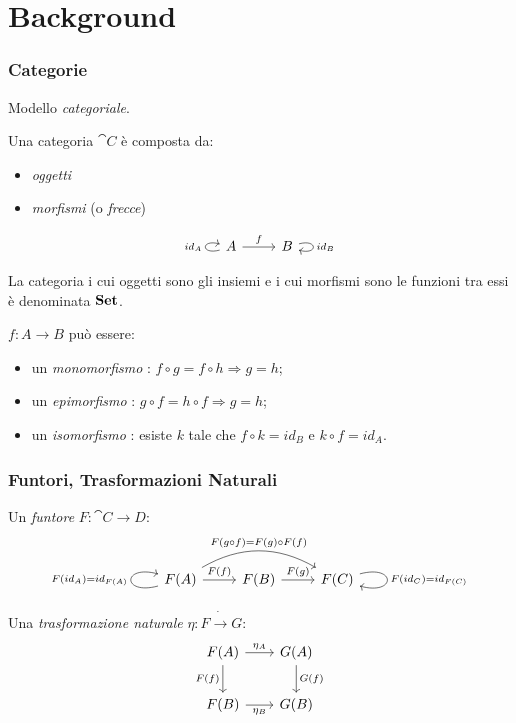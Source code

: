 \documentclass[8pt]{beamer}
\begin{document}
\section{Background}
\begin{frame}[fragile]\frametitle{Categorie} %
	Modello \emph{categoriale}.

	\smallskip

        Una categoria $\cat C$ \`e composta da:
	\begin{itemize}\item\emph{oggetti}\item\emph{morfismi} (o \emph{frecce})\end{itemize}
        \[
                \begin{tikzcd} A \arrow[loop left, "{id_A}"] \arrow[r, "f"] & B \arrow[loop right, "{id_B}"] \end{tikzcd}
        \]

        \smallskip
        
        La categoria i cui oggetti sono gli insiemi e i cui morfismi sono le funzioni tra essi \`e denominata $\mathbf{Set}$.
        
        \smallskip

        $f: A \to B$ pu\`o essere:
        \begin{itemize}
                \item un \emph{monomorfismo} : $f \circ g = f \circ h \Rightarrow g = h$;
                \item un \emph{epimorfismo} : $g \circ f = h \circ f \Rightarrow g = h$;
                \item un \emph{isomorfismo} : esiste $k$ tale che $f \circ k = id_B$ e $k \circ f = id_A$.
        \end{itemize}

\end{frame}

\begin{frame}[fragile]\frametitle{Funtori, Trasformazioni Naturali}
	Un \emph{funtore} $F: \cat{C \to D}$:
        \[\begin{tikzcd} F(A) \arrow[loop left, "{F(id_A) = id_{F(A)}}"] \arrow[r, "F(f)"] 
        \arrow[rr, bend left=30, "{F(g \circ f) = F(g) \circ F(f)}"] & F(B) \arrow[r, "F(g)"] & F(C) 
        \arrow[loop right, "{F(id_C) = id_{F(C)}}"] \end{tikzcd}\]

        Una \emph{trasformazione naturale} $\eta:F \dot\to G$: %
    \[
        \begin{tikzcd}[row sep = 20, column sep = 20]
            F(A) \arrow[d, "F(f)" swap] \arrow[r, "{\eta_A}"] & G(A) \arrow[d, "G(f)"] \\
            F(B) \arrow[r, "{\eta_B}"swap] & G(B)
        \end{tikzcd}
    \]

\end{frame}
\end{document}
